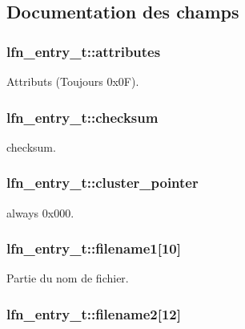 \subsection{Documentation des champs}
\hypertarget{structlfn__entry__t_a5b1eb8b963f05e47b3d6508b5a986985}{
\subsubsection[{attributes}]{ lfn\+\_\+entry\+\_\+t\+::attributes}}\label{structlfn__entry__t_a5b1eb8b963f05e47b3d6508b5a986985}
Attributs (Toujours 0x0\+F). \hypertarget{structlfn__entry__t_a1a60017a7c8b7502fefc8358a821f0ae}{
\subsubsection[{checksum}]{ lfn\+\_\+entry\+\_\+t\+::checksum}}\label{structlfn__entry__t_a1a60017a7c8b7502fefc8358a821f0ae}
checksum. \hypertarget{structlfn__entry__t_a6f3355b0c241c7a5936c04dccf1614ca}{
\subsubsection[{cluster\+\_\+pointer}]{ lfn\+\_\+entry\+\_\+t\+::cluster\+\_\+pointer}}\label{structlfn__entry__t_a6f3355b0c241c7a5936c04dccf1614ca}
always 0x000. \hypertarget{structlfn__entry__t_a04e5c493f02fa433b7d7d2d489c89e60}{
\subsubsection[{filename1}]{ lfn\+\_\+entry\+\_\+t\+::filename1\mbox{[}10\mbox{]}}}\label{structlfn__entry__t_a04e5c493f02fa433b7d7d2d489c89e60}
Partie du nom de fichier. \hypertarget{structlfn__entry__t_ab88e34e402a566da06c83163e94a1763}{
\subsubsection[{filename2}]{ lfn\+\_\+entry\+\_\+t\+::filename2\mbox{[}12\mbox{]}}}\label{structlfn__entry__t_ab88e34e402a566da06c83163e94a1763}
